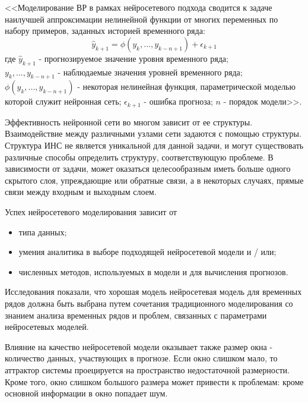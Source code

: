 <<Моделирование ВР в рамках нейросетевого подхода сводится к задаче наилучшей аппроксимации нелинейной функции от многих переменных по набору примеров, заданных историей временного ряда:
$$\widehat{y}_{k+1}=\phi(y_k, ..., y_{k-n+1}) + \epsilon_{k+1} $$
где $\widehat{y}_{k+1}$ - прогнозируемое значение уровня временного ряда; \\
$y_k, ..., y_{k-n+1}$ - наблюдаемые значения уровней временного ряда;\\
$\phi(y_k, ..., y_{k-n+1})$ - некоторая нелинейная функция, параметрической моделью которой служит нейронная сеть;
$\epsilon_{k+1}$ - ошибка прогноза;
$n$ - порядок модели>>.

Эффективность нейронной сети во многом зависит от ее структуры. Взаимодействие между различными узлами сети
задаются с помощью структуры. Структура ИНС не является уникальной для данной задачи, и могут существовать различные способы определить структуру, соответствующую проблеме. В зависимости от задачи, может оказаться целесообразным иметь больше одного скрытого слоя, упреждающие или обратные связи, а в некоторых случаях, прямые связи между входным и выходным слоем.

Успех нейросетевого моделирования зависит от
\begin{itemize}
\item типа данных;
\item умения аналитика в выборе подходящей нейросетевой модели и / или;
\item численных методов, используемых в модели и для вычисления прогнозов.
\end{itemize}
Исследования показали, что хорошая модель нейросетевая модель для временных рядов должна быть выбрана путем сочетания традиционного моделирования со знанием анализа временных рядов и проблем, связанных с параметрами нейросетевых моделей.  

Влияние на качество нейросетевой модели оказывает также размер окна -  количество данных, участвующих в прогнозе.
Если окно слишком мало, то аттрактор системы проецируется на пространство недостаточной размерности. Кроме того, окно слишком большого размера может привести к проблемам: кроме основной информации в окно попадает шум.

